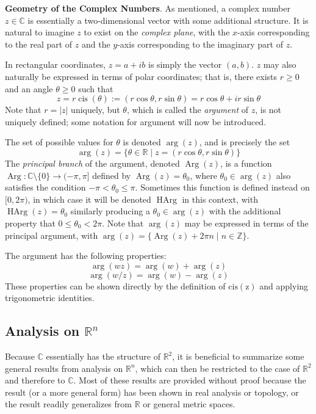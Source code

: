 \begin{shaded}
    \textbf{Geometry of the Complex Numbers}. As mentioned, a complex number $z\in\mathbb{C}$ is essentially a two-dimensional vector with some additional structure. It is natural to imagine $z$ to exist on the \textit{complex plane}, with the $x$-axis corresponding to the real part of $z$ and the $y$-axis corresponding to the imaginary part of $z$.

    In rectangular coordinates, $z=a+ib$ is simply the vector $(a,b)$. $z$ may also naturally be expressed in terms of polar coordinates; that is, there exists $r\geq 0$ and an angle $\theta\geq 0$ such that \[z=r\operatorname{cis}(\theta) := (r\cos\theta,r\sin\theta) = r\cos\theta + ir\sin\theta\] Note that $r=|z|$ uniquely, but $\theta$, which is called the \textit{argument} of $z$, is not uniquely defined; some notation for argument will now be introduced.

    The set of possible values for $\theta$ is denoted $\arg(z)$, and is precisely the set \[\arg(z) = \{\theta\in\mathbb{R}\mid z=(r\cos\theta,r\sin\theta)\}\] The \textit{principal branch} of the argument, denoted $\operatorname{Arg}(z)$, is a function $\operatorname{Arg}:\mathbb{C}\setminus\{0\}\to (-\pi,\pi]$ defined by $\operatorname{Arg}(z) = \theta_0$, where $\theta_0\in \arg(z)$ also satisfies the condition $-\pi<\theta_0\leq \pi$. Sometimes this function is defined instead on $[0,2\pi)$, in which case it will be denoted $\operatorname{HArg}$ in this context, with $\operatorname{HArg}(z)=\theta_0$ similarly producing a $\theta_0\in \arg(z)$ with the additional property that $0\leq \theta_0<2\pi$. Note that $\arg(z)$ may be expressed in terms of the principal argument, with $\arg(z) = \{\operatorname{Arg}(z)+2\pi n\mid n\in\mathbb{Z}\}$.

    The argument has the following properties:
    \[\arg(wz) = \arg(w)+\arg(z)\tag{1}\]
    \[\arg(w/z) = \arg(w)-\arg(z)\tag{2}\] These properties can be shown directly by the definition of $\operatorname{cis(z)}$ and applying trigonometric identities.
\end{shaded}

\subsection{Analysis on \texorpdfstring{$\mathbb{R}^n$}{R^n}}

Because $\mathbb{C}$ essentially has the structure of $\mathbb{R}^2$, it is beneficial to summarize some general results from analysis on $\mathbb{R}^n$, which can then be restricted to the case of $\mathbb{R}^2$ and therefore to $\mathbb{C}$. Most of these results are provided without proof because the result (or a more general form) has been shown in real analysis or topology, or the result readily generalizes from $\mathbb{R}$ or general metric spaces.

